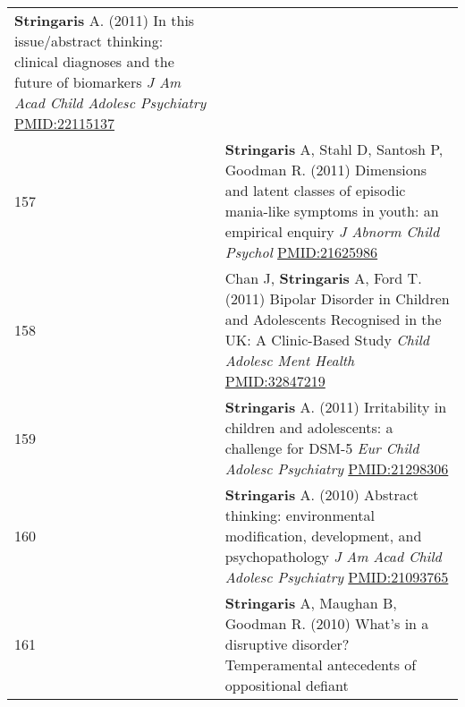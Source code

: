 \documentclass[
]{article}
\begin{document}
\begin{longtable}[]{@{}ll@{}}
\begin{minipage}[t]{0.94\columnwidth}
\textbf{Stringaris} A. (2011) In this issue/abstract thinking: clinical
diagnoses and the future of biomarkers \emph{J Am Acad Child Adolesc
Psychiatry} \url{PMID:22115137}\strut
\end{minipage}\tabularnewline
\begin{minipage}[t]{0.01\columnwidth}\raggedright
157\strut
\end{minipage} & \begin{minipage}[t]{0.94\columnwidth}\raggedright
\textbf{Stringaris} A, Stahl D, Santosh P, Goodman R. (2011) Dimensions
and latent classes of episodic mania-like symptoms in youth: an
empirical enquiry \emph{J Abnorm Child Psychol}
\url{PMID:21625986}\strut
\end{minipage}\tabularnewline
\begin{minipage}[t]{0.01\columnwidth}\raggedright
158\strut
\end{minipage} & \begin{minipage}[t]{0.94\columnwidth}\raggedright
Chan J, \textbf{Stringaris} A, Ford T. (2011) Bipolar Disorder in
Children and Adolescents Recognised in the UK: A Clinic-Based Study
\emph{Child Adolesc Ment Health} \url{PMID:32847219}\strut
\end{minipage}\tabularnewline
\begin{minipage}[t]{0.01\columnwidth}\raggedright
159\strut
\end{minipage} & \begin{minipage}[t]{0.94\columnwidth}\raggedright
\textbf{Stringaris} A. (2011) Irritability in children and adolescents:
a challenge for DSM-5 \emph{Eur Child Adolesc Psychiatry}
\url{PMID:21298306}\strut
\end{minipage}\tabularnewline
\begin{minipage}[t]{0.01\columnwidth}\raggedright
160\strut
\end{minipage} & \begin{minipage}[t]{0.94\columnwidth}\raggedright
\textbf{Stringaris} A. (2010) Abstract thinking: environmental
modification, development, and psychopathology \emph{J Am Acad Child
Adolesc Psychiatry} \url{PMID:21093765}\strut
\end{minipage}\tabularnewline
\begin{minipage}[t]{0.01\columnwidth}\raggedright
161\strut
\end{minipage} & \begin{minipage}[t]{0.94\columnwidth}\raggedright
\textbf{Stringaris} A, Maughan B, Goodman R. (2010) What's in a
disruptive disorder? Temperamental antecedents of oppositional defiant

\end{minipage}
\end{longtable}
\end{document}
